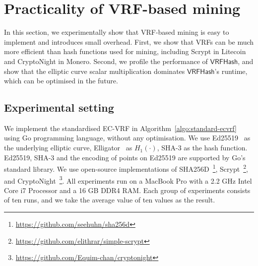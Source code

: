 \section{Practicality of VRF-based mining}
\label{sec:practicality}

In this section, we experimentally show that VRF-based mining is easy to implement and introduces small overhead.
First, we show that VRFs can be much more efficient than hash functions used for mining, including Scrypt in Litecoin and CryptoNight in Monero.
Second, we profile the performance of $\mathsf{VRFHash}$, and show that the elliptic curve scalar multiplication dominates $\mathsf{VRFHash}$'s runtime, which can be optimised in the future.

\subsection{Experimental setting}

We implement the standardised EC-VRF in Algorithm~\ref{algo:standard-ecvrf} using Go programming language, without any optimisation.
We use Ed25519~\cite{bernstein2012high} as the underlying elliptic curve, Elligator~\cite{bernstein2013elligator} as $H_1(\cdot)$, SHA-3 as the hash function.
Ed25519, SHA-3 and the encoding of points on Ed25519 are supported by Go's standard library.
We use open-source implementations of SHA256D~\footnote{\url{https://github.com/seehuhn/sha256d}}, Scrypt~\footnote{\url{https://github.com/elithrar/simple-scrypt}}, and CryptoNight~\footnote{\url{https://github.com/Equim-chan/cryptonight}}.
All experiments run on a MacBook Pro with a 2.2 GHz Intel Core i7 Processor and a 16 GB DDR4 RAM.
Each group of experiments consists of ten runs, and we take the average value of ten values as the result.

